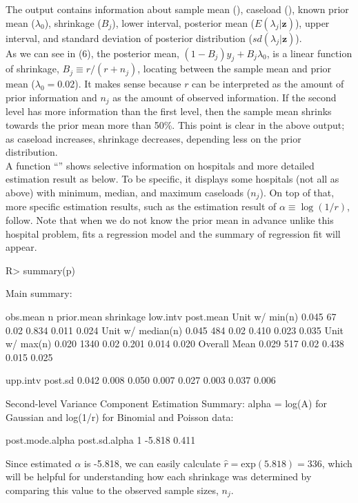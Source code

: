 \documentclass[article]{jss}
\begin{document}
The output contains information about sample mean (), caseload (), known prior mean ($\lambda_{0}$), shrinkage ($B_{j}$), lower interval, posterior mean ($E(\lambda_{j}\vert \textbf{z})$), upper interval, and standard deviation of posterior distribution ($sd(\lambda_{j}\vert \textbf{z})$).
\\

As we can see in (6), the posterior mean, $(1-B_{j})y_{j} + B_{j}\lambda_{0}$, is a linear function of shrinkage, $B_{j}\equiv r / (r + n_{j})$, locating between the sample mean and prior mean ($\lambda_{0}=0.02$). It makes sense because $r$ can be interpreted as the amount of prior information and $n_{j}$ as the amount of observed information. If the second level has more information than the first level, then the sample mean shrinks towards the prior mean more than 50\%. This point is clear in the above output; as caseload increases, shrinkage decreases, depending less on the prior distribution.
\\

A function ``'' shows selective information on hospitals and more detailed estimation result as below. To be specific, it displays some hospitals (not all as above) with minimum, median, and maximum caseloads ($n_{j}$). On top of that, more specific estimation results, such as the estimation result of $\alpha\equiv\log(1/r)$, follow. Note that when we do not know the prior mean in advance unlike this hospital problem,  fits a regression model and the summary of regression fit will appear.
\begin{CodeChunk}
\begin{CodeInput}
R> summary(p)
\end{CodeInput}
\begin{CodeOutput}
Main summary:

                  obs.mean    n prior.mean shrinkage low.intv post.mean
Unit w/ min(n)       0.045   67       0.02     0.834    0.011     0.024
Unit w/ median(n)    0.045  484       0.02     0.410    0.023     0.035
Unit w/ max(n)       0.020 1340       0.02     0.201    0.014     0.020
Overall Mean         0.029  517       0.02     0.438    0.015     0.025

                  upp.intv post.sd
                     0.042   0.008
                     0.050   0.007
                     0.027   0.003
                     0.037   0.006

Second-level Variance Component Estimation Summary:
alpha = log(A) for Gaussian and log(1/r) for Binomial and Poisson data:

  post.mode.alpha post.sd.alpha
1          -5.818         0.411
\end{CodeOutput}
\end{CodeChunk}
Since estimated $\alpha$ is -5.818, we can easily calculate $\hat{r}=\textrm{exp}(5.818)=336$, which will be helpful for understanding how each shrinkage was determined by comparing this value to the observed sample sizes, $n_{j}$.
\\
\end{document}
